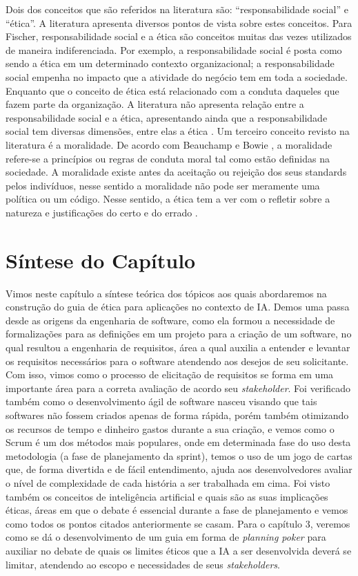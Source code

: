  Dois dos conceitos que são referidos na literatura são: “responsabilidade social” e “ética”. A literatura apresenta diversos pontos de vista sobre estes conceitos. Para Fischer, responsabilidade social e a ética são conceitos muitas das vezes utilizados de maneira indiferenciada. Por exemplo, a responsabilidade social é posta como sendo a ética em um determinado contexto organizacional; a responsabilidade social empenha no impacto que a atividade do negócio tem em toda a sociedade. Enquanto que o conceito de ética está relacionado com a conduta daqueles que fazem parte da organização. A literatura não apresenta relação entre a responsabilidade social e a ética, apresentando ainda que a responsabilidade social tem diversas dimensões, entre elas a ética \cite{socialresponsability}. Um terceiro conceito revisto na literatura é a moralidade. De acordo com Beauchamp e Bowie \cite{ethicaltheory}, a moralidade refere-se a princípios ou regras de conduta moral tal como estão definidas na sociedade. A moralidade existe antes da aceitação ou rejeição dos seus standards pelos indivíduos, nesse sentido a moralidade não pode ser meramente uma política ou um código. Nesse sentido, a ética tem a ver com o refletir sobre a natureza e justificações do certo e do errado \cite{ethicaltheory}.

\section{Síntese do Capítulo}
Vimos neste capítulo a síntese teórica dos tópicos aos quais abordaremos na construção do guia de ética para aplicações no contexto de \acrshort{IA}. Demos uma passa desde as origens da engenharia de software, como ela formou a necessidade de formalizações para as definições em um projeto para a criação de um software, no qual resultou a engenharia de requisitos, área a qual auxilia a entender e levantar os requisitos necessários para o software atendendo aos desejos de seu solicitante. Com isso, vimos como o processo de elicitação de requisitos se forma em uma importante área para a correta avaliação de acordo seu \textit{stakeholder}. Foi verificado também como o desenvolvimento ágil de software nasceu visando que tais softwares não fossem criados apenas de forma rápida, porém também otimizando os recursos de tempo e dinheiro gastos durante a sua criação, e vemos como o Scrum é um dos métodos mais populares, onde em determinada fase do uso desta metodologia (a fase de planejamento da sprint), temos o uso de um jogo de cartas que, de forma divertida e de fácil entendimento, ajuda aos desenvolvedores avaliar o nível de complexidade de cada história a ser trabalhada em cima. Foi visto também os conceitos de inteligência artificial e quais são as suas implicações éticas, áreas em que o debate é essencial durante a fase de planejamento e vemos como todos os pontos citados anteriormente se casam. Para o capítulo 3, veremos como se dá o desenvolvimento de um guia em forma de \textit{planning poker} para auxiliar no debate de quais os limites éticos que a \acrshort{IA} a ser desenvolvida deverá se limitar, atendendo ao escopo e necessidades de seus \textit{stakeholders}.